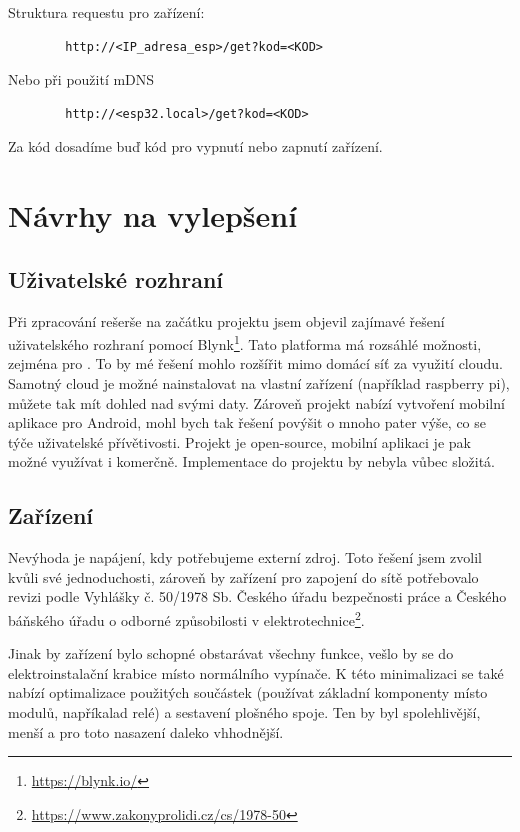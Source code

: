 \documentclass[11pt,a4paper,twoside,openright]{report}
\begin{document}
	
	Struktura requestu pro zařízení:
	\begin{verbatim}
		http://<IP_adresa_esp>/get?kod=<KOD>
	\end{verbatim}
	Nebo při použití mDNS
	\begin{verbatim}
		http://<esp32.local>/get?kod=<KOD>
	\end{verbatim}
	
	Za kód dosadíme buď kód pro vypnutí nebo zapnutí zařízení.
	
	\section{Návrhy na vylepšení}
	\subsection{Uživatelské rozhraní}
	Při zpracování rešerše na začátku projektu jsem objevil zajímavé řešení uživatelského rozhraní pomocí Blynk\footnote{\url{https://blynk.io/}}. Tato platforma má rozsáhlé možnosti, zejména pro . To by mé řešení mohlo rozšířit mimo  domácí síť za využití cloudu. Samotný cloud je možné nainstalovat na vlastní zařízení (například raspberry pi), můžete tak mít dohled nad svými daty. Zároveň projekt nabízí vytvoření mobilní aplikace pro Android, mohl bych tak řešení povýšit o mnoho pater výše, co se týče uživatelské přívětivosti. Projekt je open-source, mobilní aplikaci je pak možné využívat i komerčně. Implementace do projektu by nebyla vůbec složitá.
	
	
	\subsection{Zařízení}
	Nevýhoda  je napájení, kdy potřebujeme externí zdroj. Toto řešení jsem zvolil kvůli své jednoduchosti, zároveň by zařízení pro zapojení do sítě potřebovalo revizi podle Vyhlášky č. 50/1978 Sb. Českého úřadu bezpečnosti práce a Českého báňského úřadu o odborné způsobilosti v elektrotechnice\footnote{\url{https://www.zakonyprolidi.cz/cs/1978-50}}. 
	
	
	Jinak by zařízení bylo schopné obstarávat všechny funkce, vešlo by se do elektroinstalační krabice místo normálního vypínače. K této minimalizaci se také nabízí optimalizace použitých součástek (používat základní komponenty místo modulů, napříkalad relé) a sestavení plošného spoje. Ten by byl spolehlivější, menší a pro toto nasazení daleko vhhodnější.
	
\end{document}
